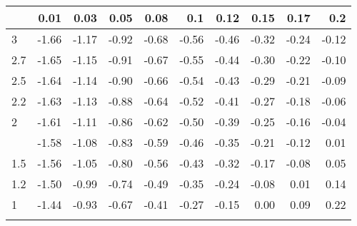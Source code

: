 
\begin{tabular}{lrrrrrrrrr}
\toprule{}
  & 0.01 & 0.03 & 0.05 & 0.08 & 0.1 & 0.12 & 0.15 & 0.17 & 0.2\\
\midrule{}
3 & -1.66 & -1.17 & -0.92 & -0.68 & -0.56 & -0.46 & -0.32 & -0.24 & -0.12\\
2.7 & -1.65 & -1.15 & -0.91 & -0.67 & -0.55 & -0.44 & -0.30 & -0.22 & -0.10\\
2.5 & -1.64 & -1.14 & -0.90 & -0.66 & -0.54 & -0.43 & -0.29 & -0.21 & -0.09\\
2.2 & -1.63 & -1.13 & -0.88 & -0.64 & -0.52 & -0.41 & -0.27 & -0.18 & -0.06\\
2 & -1.61 & -1.11 & -0.86 & -0.62 & -0.50 & -0.39 & -0.25 & -0.16 & -0.04\\
\addlinespace
1.7 & -1.58 & -1.08 & -0.83 & -0.59 & -0.46 & -0.35 & -0.21 & -0.12 & 0.01\\
1.5 & -1.56 & -1.05 & -0.80 & -0.56 & -0.43 & -0.32 & -0.17 & -0.08 & 0.05\\
1.2 & -1.50 & -0.99 & -0.74 & -0.49 & -0.35 & -0.24 & -0.08 & 0.01 & 0.14\\
1 & -1.44 & -0.93 & -0.67 & -0.41 & -0.27 & -0.15 & 0.00 & 0.09 & 0.22\\
\bottomrule{}
\end{tabular}
